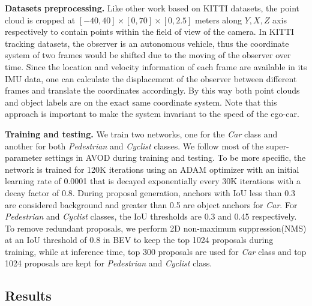 \documentclass{bmvc2k}
\begin{document}
\textbf{Datasets preprocessing.} Like other work based on KITTI datasets, the point cloud is cropped at $[-40, 40] \times [0, 70] \times [0, 2.5]$ meters along $Y, X, Z$ axis respectively to contain points within the field of view of the camera. In KITTI tracking datasets, the observer is an autonomous vehicle, thus the coordinate system of two frames would be shifted due to the moving of the observer over time. Since the location and velocity information of each frame are available in its IMU data, one can calculate the displacement of the observer between different frames and translate the coordinates accordingly. By this way both point clouds and object labels are on the exact same coordinate system. Note that this approach is important to make the system invariant to the speed of the ego-car.

\textbf{Training and testing.} We train two networks, one for the \textit{Car} class and another for both \textit{Pedestrian} and \textit{Cyclist} classes. We follow most of the super-parameter settings in AVOD\cite{ku2018joint} during training and testing. To be more specific, the network is trained for 120K iterations using an ADAM\cite{kingma2014adam} optimizer with an initial learning rate of 0.0001 that is decayed exponentially every 30K iterations with a decay factor of 0.8. During proposal generation, anchors with IoU less than 0.3 are considered background and greater than 0.5 are object anchors for \textit{Car}. For \textit{Pedestrian} and \textit{Cyclist} classes, the IoU thresholds are 0.3 and 0.45 respectively. To remove redundant proposals, we perform 2D non-maximum suppression(NMS) at an IoU threshold of 0.8 in BEV to keep the top 1024 proposals during training, while at inference time, top 300 proposals are used for \textit{Car} class and top 1024 proposals are kept for \textit{Pedestrian} and \textit{Cyclist} class.

\subsection{Results}
\end{document}
